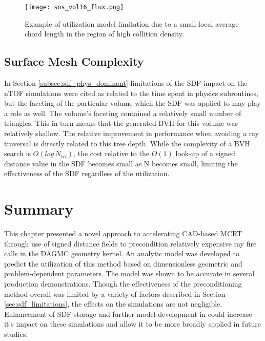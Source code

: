 \begin{figure}
  \centering
  \texttt{[image: sns\_vol16\_flux.png]}
  \caption{Example of utilization model limitation due to a small local average chord length
    in the region of high collition density.}
  \label{fig:sns_low_util}
\end{figure}

\subsection{Surface Mesh Complexity}\label{subsec:sdf_tree_depth}

In Section \ref{subsec:sdf_phys_dominant} limitations of the SDF impact on the
nTOF simulations were cited as related to the time spent in physics subroutines,
but the faceting of the particular volume which the SDF was applied to may play
a role as well. The volume's faceting contained a relatively small number of
triangles. This in turn means that the generated BVH for this volume was
relatively shallow. The relative improvement in performance when avoiding a ray
traversal is directly related to this tree depth. While the complexity of a BVH
search is $O(log\, N_{tri})$, the cost relative to the $O(1)$ look-up of a signed
distance value in the SDF becomes small as N becomes small, limiting the
effectiveness of the SDF regardless of the utilization.

\section{Summary}

This chapter presented a novel approach to accelerating CAD-based MCRT through
use of signed distance fields to precondition relatively expensive ray fire
calls in the DAGMC geometry kernel. An analytic model was developed to predict the
utilization of this method based on dimensionless geometric and
problem-dependent parameters. The model was shown to be accurate in several production
demonstrations. Though the effectiveness of the preconditioning method overall
was limited by a variety of factors described in Section
\ref{sec:sdf_limitations}, the effects on the simulations are not
negligible. Enhancement of SDF storage and further model development in could
increase it's impact on these simulations and allow it to be more broadly
applied in future studies.
